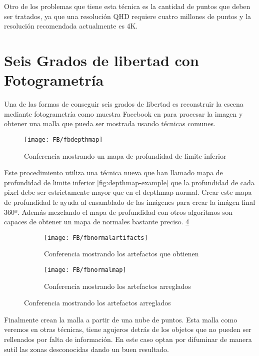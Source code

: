 Otro de los problemas que tiene esta técnica es la cantidad de puntos que deben ser tratados, ya que una resolución QHD requiere cuatro millones de puntos y la resolución recomendada actualmente es 4K.

\section{Seis Grados de libertad con Fotogrametría}
Una de las formas de conseguir seis grados de libertad es reconstruir la escena mediante fotogrametría como muestra Facebook en \cite{FBCasual3DCapture} para procesar la imagen y obtener una malla que pueda ser mostrada usando técnicas comunes.

\begin{figure}[h]
  \centering
	\texttt{[image: FB/fbdepthmap]}
  \caption{Conferencia mostrando un mapa de profundidad de limite inferior}
  \label{fig:fbLBdepthmap-example}
\end{figure}

Este procedimiento utiliza una técnica nueva que han llamado mapa de profundidad de limite inferior \ref{fig:depthmap-example} que la profundidad de cada pixel debe ser estrictamente mayor que en el depthmap normal. Crear este mapa de profundidad le ayuda al ensamblado de las imágenes para crear la imágen final 360º. Además mezclando el mapa de profundidad con otros algoritmos son capaces de obtener un mapa de normales bastante preciso. \ref{fig:fbnormalmapcorrected-example}

\begin{figure}[h]
\centering
\begin{subfigure}{.5\linewidth}
	\centering
	\texttt{[image: FB/fbnormalartifacts]}
  \caption{Conferencia mostrando los artefactos que obtienen}
  \label{fig:fbnormalmapartifacts-example}
\end{subfigure}%
\begin{subfigure}{.5\linewidth}
	\centering
	\texttt{[image: FB/fbnormalmap]}
  \caption{Conferencia mostrando los artefactos arreglados}
  \label{fig:fbnormalmapcorrected-example}
\end{subfigure}
\end{figure}


Finalmente crean la malla a partir de una nube de puntos. Esta malla como veremos en otras técnicas, tiene agujeros detrás de los objetos que no pueden ser rellenados por falta de información. En este caso optan por difuminar de manera sutil las zonas desconocidas dando un buen resultado.

